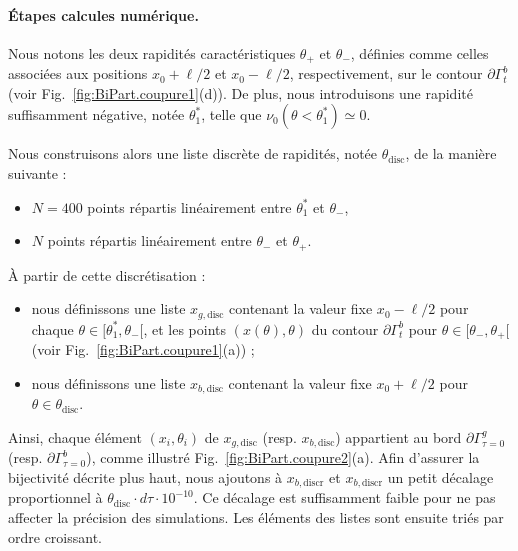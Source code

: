 \medskip

\paragraph{Étapes calcules numérique.}
Nous notons les deux rapidités caractéristiques \(\theta_+\) et \(\theta_-\), définies comme celles associées aux positions \(x_0 + \ell/2\) et \(x_0 - \ell/2\), respectivement, sur le contour \(\partial \Gamma_t^b\) (voir Fig.~\ref{fig:BiPart.coupure1}(d)).  
De plus, nous introduisons une rapidité suffisamment négative, notée \(\theta_1^*\), telle que \(\nu_0(\theta<\theta_1^*) \simeq 0\).

\medskip

Nous construisons alors une liste discrète de rapidités, notée \(\theta_{\mathrm{disc}}\), de la manière suivante :
\begin{itemize}[label = $\bullet$]
	\item \(N=400\) points répartis linéairement entre \(\theta_1^*\) et \(\theta_-\),
	\item \(N\) points répartis linéairement entre \(\theta_-\) et \(\theta_+\).
\end{itemize}


À partir de cette discrétisation :
\begin{itemize}[label = $\bullet$]
	\item nous définissons une liste \(x_{g,\mathrm{disc}}\) contenant la valeur fixe \(x_0 - \ell/2\) pour chaque \(\theta \in [\theta_1^*,\theta_-[\), et les points \((x(\theta),\theta)\) du contour \(\partial \Gamma_t^b\) pour \(\theta \in [\theta_-,\theta_+[\) (voir Fig.~\ref{fig:BiPart.coupure1}(a)) ;
	\item nous définissons une liste \(x_{b,\mathrm{disc}}\) contenant la valeur fixe \(x_0 + \ell/2\) pour \(\theta \in \theta_{\mathrm{disc}}\).
\end{itemize}

Ainsi, chaque élément \((x_i,\theta_i)\) de \(x_{g,\mathrm{disc}}\) (resp. \(x_{b,\mathrm{disc}}\)) appartient au bord \(\partial \Gamma_{\tau=0}^g\) (resp. \(\partial \Gamma_{\tau=0}^b\)), comme illustré Fig.~\ref{fig:BiPart.coupure2}(a).  
Afin d’assurer la bijectivité décrite plus haut, nous ajoutons à $x_{b,\mathrm{discr}}$ et $x_{b,\mathrm{discr}}$ un petit décalage proportionnel à \(\theta_{\mathrm{disc}} \cdot d\tau \cdot 10^{-10}\). Ce décalage est suffisamment faible pour ne pas affecter la précision des simulations. Les éléments des listes sont ensuite triés par ordre croissant.

